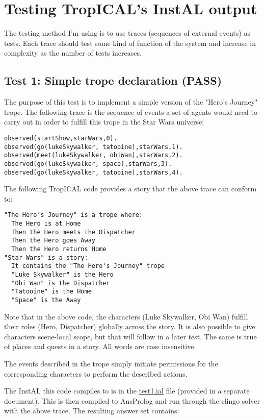 \documentclass[11pt]{article}
\date{\today}
\title{}
\begin{document}
\tableofcontents

\section{Testing TropICAL's InstAL output}
\label{sec:orgheadline9}
The testing method I'm using is to use traces (sequences of external events) as tests. Each trace should test some kind of function of the system and increase in complexity as the number of tests increases.

\subsection{Test 1: Simple trope declaration (PASS)}
\label{sec:orgheadline1}
The purpose of this test is to implement a simple version of the "Hero's Journey" trope. The following trace is the sequence of events a set of agents would need to carry out in order to fulfill this trope in the Star Wars universe:

\begin{verbatim}
observed(startShow,starWars,0).
observed(go(lukeSkywalker, tatooine),starWars,1).
observed(meet(lukeSkywalker, obiWan),starWars,2).
observed(go(lukeSkywalker, space),starWars,3).
observed(go(lukeSkywalker, tatooine),starWars,4).
\end{verbatim}

The following TropICAL code provides a story that the above trace can conform to:

\begin{verbatim}
"The Hero's Journey" is a trope where:
  The Hero is at Home
  Then the Hero meets the Dispatcher
  Then the Hero goes Away
  Then the Hero returns Home
"Star Wars" is a story:
  It contains the "The Hero's Journey" trope
  "Luke Skywalker" is the Hero
  "Obi Wan" is the Dispatcher
  "Tatooine" is the Home
  "Space" is the Away
\end{verbatim}

Note that in the above code, the characters (Luke Skywalker, Obi Wan) fulfill their roles (Hero, Dispatcher) globally across the story. It is also possible to give characters scene-local scope, but that will follow in a later test. The same is true of places and quests in a story. All words are case insensitive.

The events described in the trope simply initiate permissions for the corresponding characters to perform the described actions.

The InstAL this code compiles to is in the \href{file:///home/cblop/Dropbox/clojure/tropic/resources/test1.ial}{test1.ial} file (provided in a separate document). This is then compiled to AnsProlog and run through the clingo solver with the above trace. The resulting answer set contains:
\end{document}
